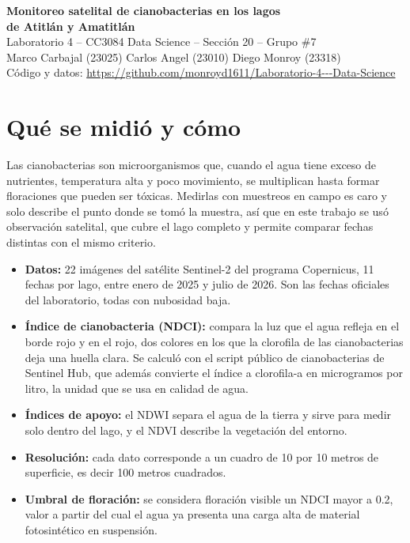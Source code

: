\documentclass[10pt,a4paper]{article}
\begin{document}
\begin{center}
{\LARGE\bfseries Monitoreo satelital de cianobacterias en los lagos\\[2pt]
de Atitlán y Amatitlán}\\[6pt]
{\normalsize Laboratorio 4 -- CC3084 Data Science -- Sección 20 -- Grupo \#7}\\[4pt]
{\small Marco Carbajal (23025) \quad Carlos Angel (23010) \quad Diego Monroy (23318)}\\[4pt]
{\small Código y datos: \url{https://github.com/monroyd1611/Laboratorio-4---Data-Science}}
\end{center}

\vspace{2pt}

\section{Qué se midió y cómo}

Las cianobacterias son microorganismos que, cuando el agua tiene exceso de nutrientes, temperatura alta y poco
movimiento, se multiplican hasta formar floraciones que pueden ser tóxicas. Medirlas con muestreos en campo es caro
y solo describe el punto donde se tomó la muestra, así que en este trabajo se usó observación satelital, que cubre
el lago completo y permite comparar fechas distintas con el mismo criterio.

\begin{itemize}
  \item \textbf{Datos:} 22 imágenes del satélite Sentinel-2 del programa Copernicus, 11 fechas por lago, entre enero
  de 2025 y julio de 2026. Son las fechas oficiales del laboratorio, todas con nubosidad baja.
  \item \textbf{Índice de cianobacteria (NDCI):} compara la luz que el agua refleja en el borde rojo y en el rojo,
  dos colores en los que la clorofila de las cianobacterias deja una huella clara. Se calculó con el script público
  de cianobacterias de Sentinel Hub, que además convierte el índice a clorofila-a en microgramos por litro, la
  unidad que se usa en calidad de agua.
  \item \textbf{Índices de apoyo:} el NDWI separa el agua de la tierra y sirve para medir solo dentro del lago, y el
  NDVI describe la vegetación del entorno.
  \item \textbf{Resolución:} cada dato corresponde a un cuadro de 10 por 10 metros de superficie, es decir 100
  metros cuadrados.
  \item \textbf{Umbral de floración:} se considera floración visible un NDCI mayor a 0.2, valor a partir del cual el
  agua ya presenta una carga alta de material fotosintético en suspensión.
\end{itemize}
\end{document}

